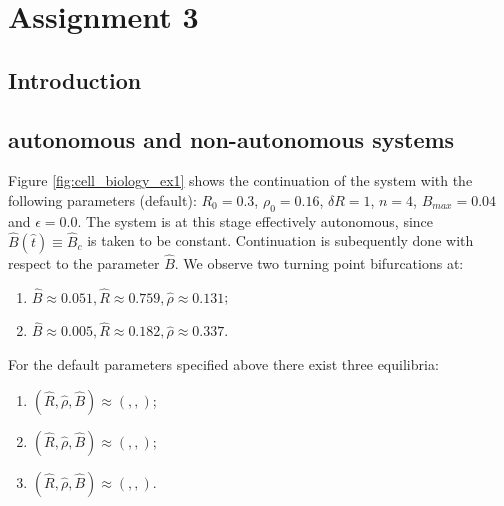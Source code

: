 \section{Assignment 3}

\subsection{Introduction}

\subsection{autonomous and non-autonomous systems}
Figure \ref{fig:cell_biology_ex1} shows the continuation of the system with the following parameters (default): $R_0 = 0.3$, $\rho_0 = 0.16$, $\delta R = 1$, $n = 4$, $B_{max} = 0.04$ and $\epsilon = 0.0$. 
The system is at this stage effectively autonomous, since $\hat{B}(\hat{t}) \equiv \hat{B}_c$ is taken to be constant. Continuation is subequently done with respect to the parameter $\hat{B}$. We observe two turning point bifurcations at:
\begin{enumerate}
    \item $\hat{B} \approx 0.051, \hat{R}\approx0.759, \hat{\rho}\approx0.131$; 
    \item $\hat{B} \approx 0.005, \hat{R}\approx0.182, \hat{\rho}\approx0.337$.
\end{enumerate}
For the default parameters specified above there exist three equilibria:
\begin{enumerate}
    \item $(\hat{R}, \hat{\rho}, \hat{B}) \approx (, , )$;
    \item $(\hat{R}, \hat{\rho}, \hat{B}) \approx (, , )$;
    \item $(\hat{R}, \hat{\rho}, \hat{B}) \approx (, , )$.
\end{enumerate}

